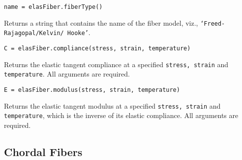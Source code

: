 \bigskip\noindent
\texttt{name = elasFiber.fiberType()}

\medskip\noindent
Returns a string that contains the name of the fiber model, viz., \texttt{`Freed-Rajagopal/Kelvin/ Hooke'}.

\medskip\noindent
\texttt{C = elasFiber.compliance(stress, strain, temperature)}

\medskip\noindent
Returns the elastic tangent compliance at a specified \texttt{stress, strain} and \texttt{temperature}.  All arguments are required.

\medskip\noindent
\texttt{E = elasFiber.modulus(stress, strain, temperature)}

\medskip\noindent
Returns the elastic tangent modulus at a specified \texttt{stress, strain} and \texttt{temperature}, which is the inverse of its elastic compliance.  All arguments are required.


\subsection{Chordal Fibers}

